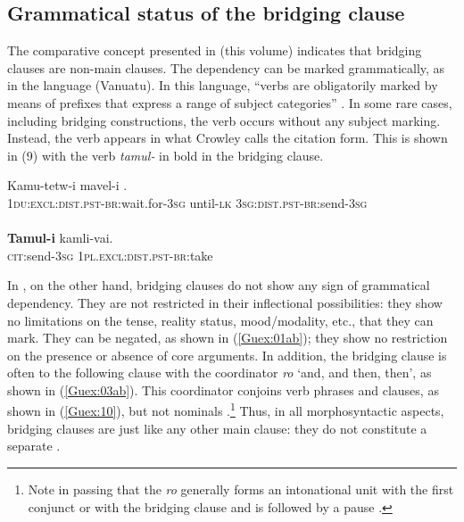 \documentclass[output=paper]{LSP/langsci}
\begin{document}
\subsection{Grammatical status of the bridging clause} 
\label{Gusec:Status}
The comparative concept presented in  (this volume) indicates that bridging clauses are non-main clauses. The dependency can be marked grammatically, as in the  language  (Vanuatu). In this language, ``verbs are obligatorily marked by means of prefixes that express a range of subject categories'' \citep[][85]{crowley98}. In some rare cases, including bridging constructions, the verb occurs without any subject marking. Instead, the verb appears in what Crowley calls the citation form. This is shown in (9) with the verb \textit{tamul-} in bold in the bridging clause. 

\begin{exe}
	\ex	\label{Guex:9ab}
	\begin{xlist}
\ex	\label{Guex:9a}
		\gll	 Kamu-tetw-i   mavel-i \underline{}.\\
			\textsc{1du:excl:dist.pst-br}:wait.for-\textsc{3sg} 	until-\textsc{lk} \textsc{3sg:dist.pst-br}:send-\textsc{3sg}\\
		\glt	{}\\
\ex	\label{Guex:9b}
		\gll	\textbf{Tamul-i} kamli-vai.\\
			\textsc{cit}:send-\textsc{3sg} \textsc{1pl.excl:dist.pst-br}:take \\
		\glt	{} \citep [][118]{crowley98}
	\end{xlist}
\end{exe}

In , on the other hand, bridging clauses do not show any sign of grammatical dependency. They are not restricted in their inflectional possibilities: they show no limitations on the tense, reality status, mood/modality, etc., that they can mark. They can be negated, as shown in (\ref{Guex:01ab}); they show no restriction on the presence or absence of core arguments. In addition, the bridging clause is often  to the following clause with the coordinator \textit{ro} `and, and then, then', as shown in (\ref{Guex:03ab}). This coordinator conjoins verb phrases and clauses, as shown in (\ref{Guex:10}), but not nominals \citep[][314ff]{guerin11}.\footnote{Note in passing that the  \textit{ro} generally forms an intonational unit with the first conjunct or with the bridging clause and is followed by a pause \citep[][321]{guerin11}.} Thus, in all morphosyntactic aspects, bridging clauses are just like any other main clause: they do not constitute a separate .  
\end{document}
